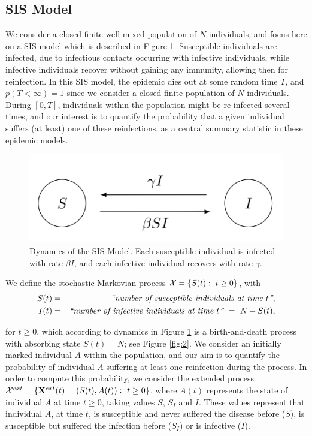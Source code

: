 \documentclass[preprint,12pt]{elsarticle}
\begin{document}
\subsection{SIS Model}
\label{SubSect21}

\par We consider a closed finite well-mixed population of $N$ individuals, and focus here on a SIS model which is described in Figure \ref{fig:1}. Susceptible individuals are infected, due to infectious contacts occurring with infective individuals, while
infective individuals recover without gaining any immunity, allowing then for reinfection. In this SIS model, the epidemic dies out at some random time $T$, and $p(T<\infty)=1$ since
we consider a closed finite population of $N$ individuals. During $[0,T]$, individuals within the population might be re-infected several times, and our
interest is to quantify the probability that a given individual suffers (at least) one of these reinfections, as a central summary statistic in these
epidemic models.
\begin{figure}
\centering
\includegraphics[width=\textwidth]{Figure1.jpg}
\caption{Dynamics of the SIS Model. Each susceptible individual is infected with rate $\beta I$, and each infective individual recovers with rate $\gamma$.}
\label{fig:1}
\end{figure}

\par We define the stochastic Markovian process ${\cal X}=\{S(t):\ t\geq0\}$, with
\begin{eqnarray*}
 S(t) &=& \hbox{\it ``number of susceptible individuals at time $t$''},\\
 I(t) &=& \hbox{\it ``number of infective individuals at time $t$''} \ = \ N-S(t),
\end{eqnarray*}
\par\noindent for $t\geq0$, which according to dynamics in Figure \ref{fig:1} is a birth-and-death process with absorbing state $S(t)=N$; see Figure \ref{fig:2}.
We consider an initially marked individual $A$ within the population, and our aim is to quantify the probability of individual $A$ suffering
at least one reinfection during the process. In order to compute this probability, we consider the extended process
${\cal X}^{ext}=\{{\bf X}^{ext}(t)=(S(t),A(t)):\ t\geq0\}$, where $A(t)$ represents the state of individual $A$ at time $t\geq0$, taking values
$S$, $S_I$ and $I$. These values represent that individual $A$, at time $t$, is susceptible and never suffered the disease before ($S$), is susceptible
but suffered the infection before ($S_I$) or is infective ($I$).
\end{document}
